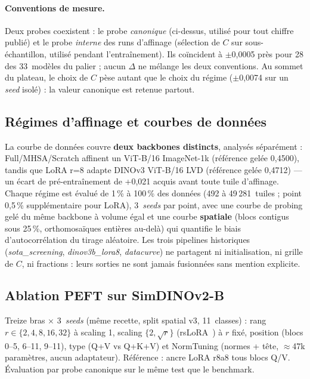 \documentclass[11pt,a4paper]{article}
\begin{document}
\paragraph{Conventions de mesure.} Deux probes coexistent : le probe \emph{canonique} (ci-dessus, utilisé pour tout chiffre publié) et le probe \emph{interne} des runs d'affinage (sélection de $C$ sur sous-échantillon, utilisé pendant l'entraînement). Ils coïncident à $\pm$0,0005 près pour 28 des 33~modèles du palier ; aucun $\Delta$ ne mélange les deux conventions. Au sommet du plateau, le choix de $C$ pèse autant que le choix du régime ($\pm$0,0074 sur un \emph{seed} isolé) : la valeur canonique est retenue partout.

\subsection{Régimes d'affinage et courbes de données}
\label{sec:sota_methods}

La courbe de données couvre \textbf{deux backbones distincts}, analysés séparément : Full/MHSA/Scratch affinent un ViT-B/16 ImageNet-1k (référence gelée 0,4500), tandis que LoRA r=8 adapte DINOv3 ViT-B/16 LVD (référence gelée 0,4712) — un écart de pré-entraînement de +0,021 acquis avant toute tuile d'affinage. Chaque régime est évalué de 1\,\% à 100\,\% des données (492 à 49\,281~tuiles ; point 0,5\,\% supplémentaire pour LoRA), 3~\emph{seeds} par point, avec une courbe de probing gelé du même backbone à volume égal et une courbe \textbf{spatiale} (blocs contigus sous 25\,\%, orthomosaïques entières au-delà) qui quantifie le biais d'autocorrélation du tirage aléatoire. Les trois pipelines historiques (\emph{sota\_screening}, \emph{dinov3b\_lora8}, \emph{datacurve}) ne partagent ni initialisation, ni grille de $C$, ni fractions : leurs sorties ne sont jamais fusionnées sans mention explicite.

\subsection{Ablation PEFT sur SimDINOv2-B}
\label{sec:peft}

Treize bras $\times$ 3~\emph{seeds} (même recette, split spatial v3, 11~classes) : rang $r \in \{2,4,8,16,32\}$ à scaling 1, scaling $\{2, \sqrt{r}\}$ (rsLoRA~\autocite{kalajdzievski2023rslora}) à $r$ fixé, position (blocs 0--5, 6--11, 9--11), type (Q+V vs Q+K+V) et NormTuning (normes + tête, $\approx$47k paramètres, aucun adaptateur). Référence : ancre LoRA r8a8 tous blocs Q/V. Évaluation par probe canonique sur le même test que le benchmark.
\end{document}
